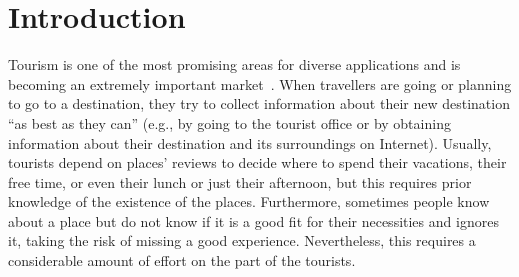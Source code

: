 \vspace{-0.2cm}
\section{Introduction}



Tourism is one of the most promising areas for diverse applications and is becoming an extremely
important market~\cite{buhalis2011tourism,murphy2013tourism,fermoso2015open,ku2015cultivating,alghamdi2016tourism,artemenko2017tourism,kazandzhieva2019tourism}. 
When travellers are going or planning to go to a destination, they try to collect information about their new destination “as best as they can” (e.g., by going to the tourist office or by obtaining information about their destination and its surroundings on 
Internet). Usually, tourists depend on places' reviews to decide where to spend their vacations, their free time, or even their lunch or just their afternoon, but this requires prior knowledge of the existence of the places. Furthermore, sometimes people know about a place but do not know if it is a good fit for their necessities and ignores it, taking the risk of missing a good experience. Nevertheless, this requires a considerable amount of effort on the part of the tourists.


